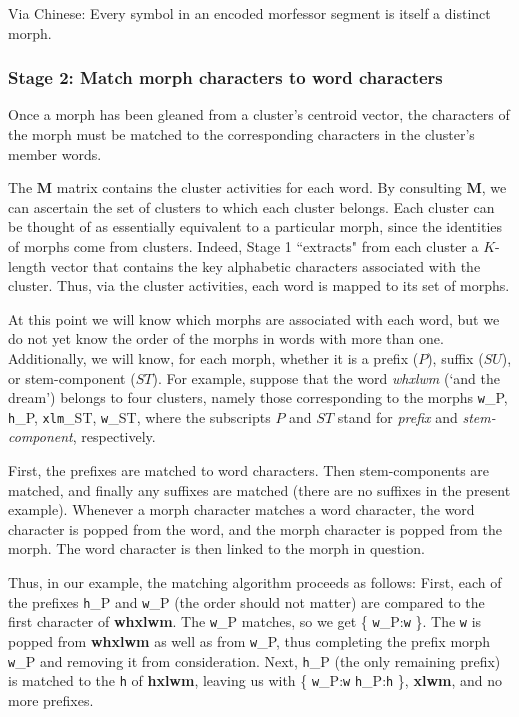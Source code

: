 Via Chinese: Every symbol in an encoded morfessor segment is itself a distinct morph.

\subsubsection{Stage 2: Match morph characters to word characters} Once a morph has been gleaned from a cluster's centroid vector, the characters of the morph must be matched to the corresponding characters in the cluster's member words. 

The $\mathbf{M}$ matrix contains the cluster activities for each word. By consulting $\mathbf{M}$, we can ascertain the set of clusters to
which each cluster belongs. Each cluster can be thought of as essentially equivalent to a particular morph, since the identities of morphs come from clusters. Indeed, Stage 1 ``extracts" from each cluster a $K$-length vector that  contains the key alphabetic characters associated with the cluster. Thus, via the cluster activities, each word is mapped to its set of morphs.

At this point we will know which morphs are associated with each word, but we do not yet know the order of the morphs in words with more than one. Additionally, we will know, for each morph, whether it is a prefix ($P$), suffix ($SU$), or stem-component ($ST$). For example, suppose that the word \textit{whxlwm} (`and the dream') belongs to four clusters, namely those corresponding to the morphs \texttt{w}_{P}, \texttt{h}_{P}, \texttt{xlm}_{ST}, \texttt{w}_{ST}, where the subscripts $P$ and $ST$ stand for \textit{prefix} and \textit{stem-component}, respectively.

First, the prefixes are matched to word characters. Then stem-components are matched, and finally any suffixes are matched (there are no suffixes in the present example). Whenever a morph character matches a word character, the word character is popped from the word, and the morph character is popped from the morph. The word character is then linked to the morph in question. 

Thus, in our example, the matching algorithm proceeds as follows: First, each of the prefixes \texttt{h}_{P} and \texttt{w}_{P} (the order should not matter) are compared to the first character of \textbf{whxlwm}. The \texttt{w}_{P} matches, so we get \{ \texttt{w}_{P}:\texttt{w} \}. The \texttt{w} is popped from \textbf{whxlwm} as well as from \texttt{w}_{P}, thus completing the prefix morph \texttt{w}_{P} and removing it from consideration. Next, \texttt{h}_{P} (the only remaining prefix) is matched to the \texttt{h} of \textbf{hxlwm}, leaving us with \{  \texttt{w}_{P}:\texttt{w} \texttt{h}_{P}:\texttt{h} \}, \textbf{xlwm}, and no more prefixes.

